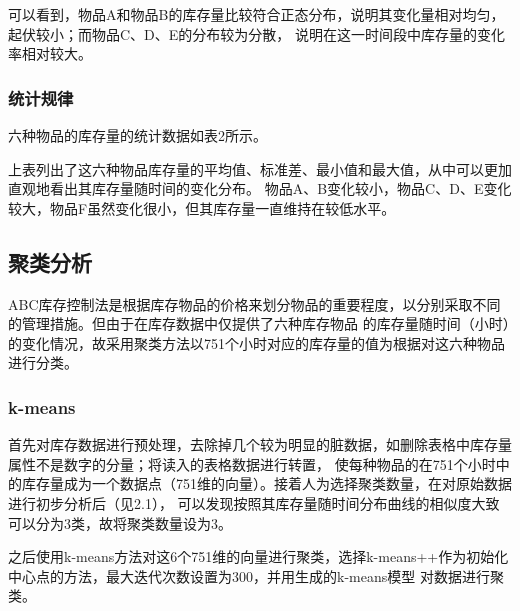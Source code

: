 \documentclass[12pt,a4paper]{article}
\begin{document}
可以看到，物品A和物品B的库存量比较符合正态分布，说明其变化量相对均匀，起伏较小；而物品C、D、E的分布较为分散，
说明在这一时间段中库存量的变化率相对较大。

\subsubsection{统计规律}
六种物品的库存量的统计数据如表2所示。
\begin{table}[ht]
    \centering
    \caption{库存量统计表}
    \label{table: 2}
\end{table}

上表列出了这六种物品库存量的平均值、标准差、最小值和最大值，从中可以更加直观地看出其库存量随时间的变化分布。
物品A、B变化较小，物品C、D、E变化较大，物品F虽然变化很小，但其库存量一直维持在较低水平。

\subsection{聚类分析}
ABC库存控制法是根据库存物品的价格来划分物品的重要程度，以分别采取不同的管理措施。但由于在库存数据中仅提供了六种库存物品
的库存量随时间（小时）的变化情况，故采用聚类方法以751个小时对应的库存量的值为根据对这六种物品进行分类。

\subsubsection{k-means}
首先对库存数据进行预处理，去除掉几个较为明显的脏数据，如删除表格中库存量属性不是数字的分量；将读入的表格数据进行转置，
使每种物品的在751个小时中的库存量成为一个数据点（751维的向量）。接着人为选择聚类数量，在对原始数据进行初步分析后（见2.1），
可以发现按照其库存量随时间分布曲线的相似度大致可以分为3类，故将聚类数量设为3。

之后使用k-means方法对这6个751维的向量进行聚类，选择k-means++作为初始化中心点的方法，最大迭代次数设置为300，并用生成的k-means模型
对数据进行聚类。
\end{document}
